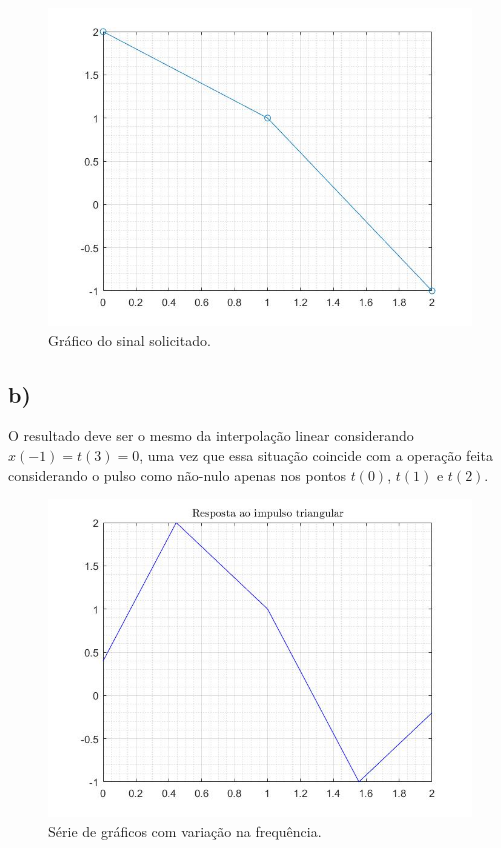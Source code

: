 \documentclass[a4paper, 12pt]{article}
\begin{document}
\begin{figure}[H]
	\centering
	\includegraphics[scale=0.5]{../Imagens/ex5/a.jpg} 
	\caption{Gráfico do sinal solicitado.}
	\label{fig:5a}
\end{figure}

\subsection{b)}

O resultado deve ser o mesmo da interpolação linear considerando $x(-1) = t(3) = 0$, uma vez que essa situação coincide com a operação feita considerando o pulso como não-nulo apenas nos pontos $t(0)$, $t(1)$ e $t(2)$.



\begin{figure}[H]
	\centering
	\includegraphics[scale=0.5]{../Imagens/ex5/b.jpg} 
	\caption{Série de gráficos com variação na frequência.}
	\label{fig:5b}
\end{figure}
\end{document}
